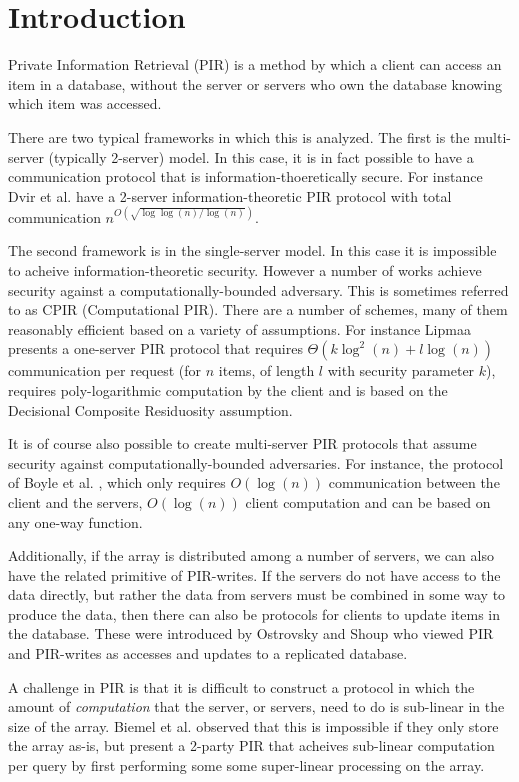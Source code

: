 \section{Introduction}

Private Information Retrieval (PIR) is a method by which
a client can access an item in a database, without the server
or servers who own the database knowing which item was accessed.

There are two typical frameworks in which this is analyzed.
The first is the multi-server (typically 2-server) model. 
In this case, it is in fact possible to have
a communication protocol that is information-thoeretically 
secure.
For instance Dvir et al. \cite{dvir20162} have a 2-server
information-theoretic PIR protocol with total communication
$n^{O(\sqrt{\log\log(n)/\log(n)})}$.

The second framework is in the single-server model.
In this case it is impossible to acheive information-theoretic
security. However a number of works achieve security against
a computationally-bounded adversary. 
This is sometimes referred to as CPIR (Computational PIR).
There are a number of schemes, many of them reasonably efficient
based on a variety of assumptions.
For instance Lipmaa \cite{lipmaa2005oblivious} presents a one-server PIR 
protocol that requires $\Theta(k\log^2(n) + l \log(n))$ communication
per request (for $n$ items, of length $l$ with security parameter $k$),
requires poly-logarithmic computation by the client and is based
on the Decisional Composite Residuosity assumption.

It is of course also possible to create multi-server PIR protocols
that assume security against computationally-bounded adversaries.
For instance, the protocol of Boyle et al. \cite{boyle2016function}, 
which only requires $O(\log(n))$
communication between the client and the servers,
$O(\log(n))$ client computation and can be based on any
one-way function.

Additionally, if the array is distributed among a number of servers,
we can also have the related primitive of PIR-writes.
If the servers do not have access to the data directly, but rather
the data from servers must be combined in some way to produce
the data, then there can also be protocols for clients to update
items in the database. 
These were introduced by Ostrovsky and Shoup \cite{ostrovsky1997private}
who viewed PIR and PIR-writes as accesses and updates to a replicated
database.

A challenge in PIR is that it is difficult to construct a protocol
in which the amount of \emph{computation} that the server, or servers,
need to do is sub-linear in the size of the array.
Biemel et al. \cite{beimel2004reducing} observed that this is
impossible if they only store the array as-is,
but present a 2-party PIR that acheives sub-linear computation per
query by first performing some some super-linear processing on the array.

